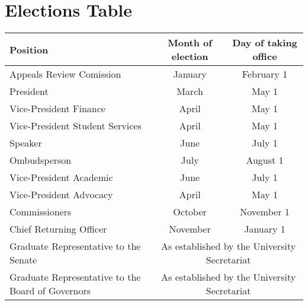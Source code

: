 \section{Elections Table}

\begin{center}
    \begin{tabular}{ l |c   c }

    Position & Month of election & Day of taking office \\  \hline
    Appeals Review Comission & January & February 1\\ 
    President & March & May 1\\
    Vice-President Finance  & April & May 1 \\ 
    Vice-President Student Services & April & May 1 \\ 
    Speaker & June & July 1 \\ 
    Ombudsperson & July & August 1\\
    Vice-President Academic & June & July 1 \\ 
    Vice-President Advocacy & April & May 1 \\ 
    Commissioners & October & November  1 \\ 
    Chief Returning Officer & November & January 1 \\ 
    Graduate Representative to the Senate &\multicolumn{2}{c}{As established by the University Secretariat}\\
	Graduate Representative to the Board of Governors  &\multicolumn{2}{c}{As established by the University Secretariat}\\	
\end{tabular}
\end{center}


\newpage
